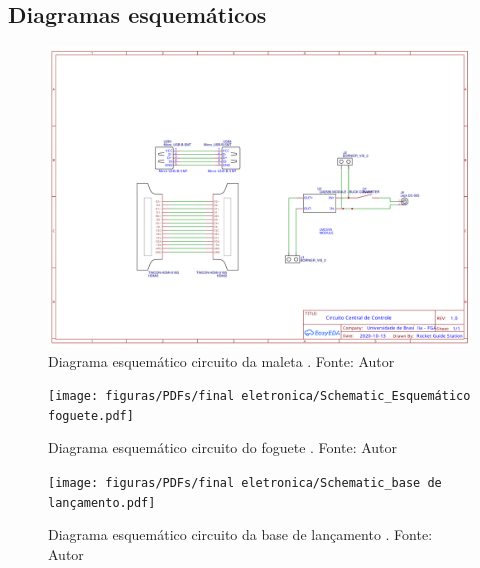 \begin{apendicesenv}
\chapter{Diagramas esquemáticos}
\begin{figure}[htb]
    \centering
    \includegraphics[width=1.3\textwidth, angle=90]{figuras/PDFs/final eletronica/Schematic_maleta final.pdf}
    \caption{Diagrama esquemático circuito da maleta . Fonte: Autor}
    \label{fig:esquematico maleta}
\end{figure}

\begin{figure}[htb]
    \centering
    \texttt{[image: figuras/PDFs/final eletronica/Schematic\_Esquemático foguete.pdf]}
    \caption{Diagrama esquemático circuito do foguete . Fonte: Autor}
    \label{fig:esquematico foguete}
\end{figure}

\begin{figure}[htb]
    \centering
    \texttt{[image: figuras/PDFs/final eletronica/Schematic\_base de lançamento.pdf]}
    \caption{Diagrama esquemático circuito da base de lançamento . Fonte: Autor}
    \label{fig:esquematico base}
\end{figure}






\end{apendicesenv}
